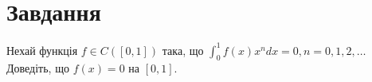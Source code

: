 
\chapter{Завдання \theHchapter}

\begin{tcolorbox}[title=Завдання]
    Нехай функція $f \in C([0,1])$ така, що 
    $\int_0^1 f(x) x^n d x=0, n=0,1,2, \ldots$ 
    Доведіть, що $f(x)=0$ на $[0,1]$.
\end{tcolorbox}

